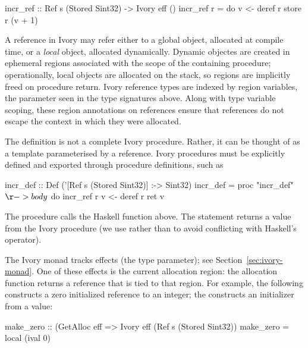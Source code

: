\begin{code}
incr_ref :: Ref s (Stored Sint32) -> Ivory eff ()
incr_ref r = do
    v <- deref r
    store r (v + 1)
\end{code}

\noindent
A reference in Ivory may refer either to a global object, allocated at
compile time, or a \emph{local} object, allocated dynamically.
Dynamic objectes are created in ephemeral regions associated
with the scope of the containing procedure; operationally, local
objects are allocated on the stack, so regions are implicitly freed
on procedure return.  Ivory reference types are indexed by region
variables, the parameter  seen in the type signatures above.
Along with type variable scoping, these region annotations on
references ensure that references do not escape the context in which
they were allocated.

The definition  is not a complete Ivory procedure.
Rather, it can be thought of as a template parameterised by a reference.
Ivory procedures must be explicitly defined and exported through
procedure definitions, such as
\begin{code}
incr_def :: Def ('[Ref s (Stored Sint32)] :-> Sint32)
incr_def = proc "incr_def" $ \r -> body $ do
  incr_ref r
  v <- deref r
  ret v
\end{code}
\noindent
The procedure  calls the Haskell function 
above. The  statement returns a value from the Ivory procedure (we use
 rather than  to avoid conflicting with Haskell's 
operator).


The Ivory monad tracks effects (the  type parameter); see
Section~\ref{sec:ivory-monad}.  One of these effects is the current allocation
region: the allocation function  returns a reference that is tied to
that region.  For example, the following constructs a zero initialized reference
to an integer; the  constructs an initializer from a value:

\begin{code}
make_zero :: (GetAlloc eff %
          => Ivory eff (Ref s (Stored Sint32))
make_zero = local (ival 0)
\end{code}

